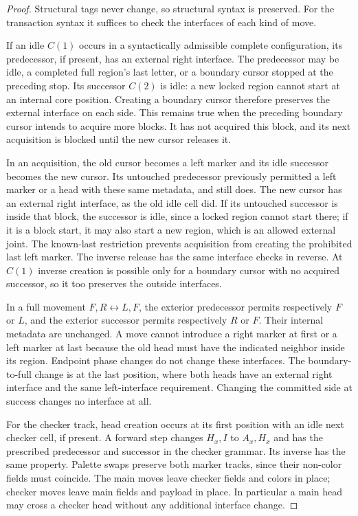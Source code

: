 \begin{proof}
Structural tags never change, so structural syntax
is preserved.  For the transaction syntax it suffices to check the
interfaces of each kind of move.

If an idle $C(1)$ occurs in a syntactically admissible complete
configuration, its predecessor, if present, has an external right
interface.  The predecessor may be idle, a completed full region's
last letter, or a boundary cursor stopped at the preceding stop.
Its successor $C(2)$ is idle: a new locked region cannot start at an
internal core position.  Creating a boundary cursor therefore
preserves the external interface on each side.  This remains true
when the preceding boundary cursor intends to acquire more blocks.
It has not acquired this block, and its next acquisition is blocked
until the new cursor releases it.

In an acquisition, the old cursor becomes a left marker and its
idle successor becomes the new cursor.  Its untouched predecessor
previously permitted a left marker or a head with these same
metadata, and still does.  The new cursor has an external right
interface, as the old idle cell did.  If its untouched successor is
inside that block, the successor is idle, since a locked region
cannot start there; if it is a block start, it may also start a new
region, which is an allowed external joint.  The known-last
restriction prevents acquisition from creating the prohibited last
left marker.  The inverse release has the same interface checks in
reverse.  At $C(1)$ inverse creation is possible only for a boundary
cursor with no acquired successor, so it too preserves the outside
interfaces.

In a full movement $F,R\leftrightarrow L,F$, the exterior
predecessor permits respectively $F$ or $L$, and the exterior
successor permits respectively $R$ or $F$.  Their internal metadata
are unchanged.  A move cannot introduce a right marker at first or
a left marker at last because the old head must have the indicated
neighbor inside its region.  Endpoint phase changes do not change
these interfaces.  The boundary-to-full change is at the last
position, where both heads have an external right interface and the
same left-interface requirement.  Changing the committed side at
success changes no interface at all.

For the checker track, head creation occurs at its first position
with an idle next checker cell, if present.  A forward step changes
$H_x,I$ to $A_x,H_x$ and has the prescribed predecessor and successor
in the checker grammar.  Its inverse has the same property.
Palette swaps preserve both marker tracks, since their non-color
fields must coincide.  The main moves leave checker fields and
colors in place; checker moves leave main fields and payload in
place.  In particular a main head may cross a checker head without
any additional interface change.


\end{proof}
